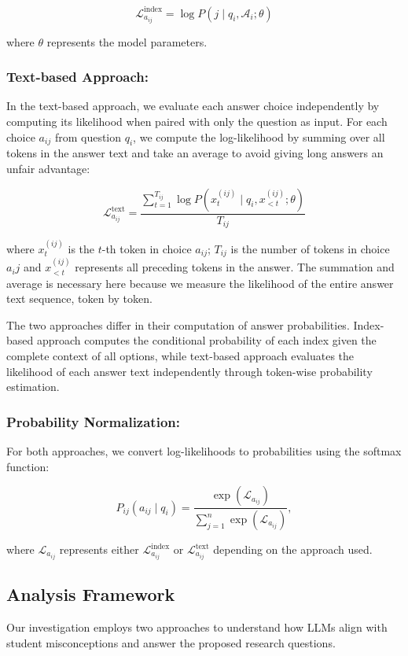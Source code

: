 $$\mathcal{L}_{a_{ij}}^{\text{index}} = \log P(j \mid q_i, \mathcal{A}_i; \theta)$$

where $\theta$ represents the model parameters.

\subsubsection{Text-based Approach:}
In the text-based approach, we evaluate each answer choice independently by computing its likelihood when paired with only the question as input. For each choice $a_{ij}$ from question $q_i$, we compute the log-likelihood by summing over all tokens in the answer text and take an average to avoid giving long answers an unfair advantage:

$$\mathcal{L}_{a_{ij}}^{\text{text}} = \frac{\sum_{t=1}^{T_{ij}} \log P(x_t^{(ij)} \mid q_i, x_{<t}^{(ij)}; \theta)}{T_{ij}}$$

where $x_t^{(ij)}$ is the $t$-th token in choice $a_{ij}$; $T_{ij}$ is the number of tokens in choice $a_ij$ and $x_{<t}^{(ij)}$ represents all preceding tokens in the answer. The summation and average is necessary here because we measure the likelihood of the entire answer text sequence, token by token. 

The two approaches differ in their computation of answer probabilities. Index-based approach computes the conditional probability of each index given the complete context of all options, while text-based approach evaluates the likelihood of each answer text independently through token-wise probability estimation.

\subsubsection{Probability Normalization:}
For both approaches, we convert log-likelihoods to probabilities using the softmax function:

$$P_{ij}(a_{ij} \mid q_i) = \frac{\exp(\mathcal{L}_{a_{ij}})}{\sum_{j=1}^{n} \exp(\mathcal{L}_{a_{ij}})},$$

where $\mathcal{L}_{a_{ij}}$ represents either $\mathcal{L}_{a_{ij}}^{\text{index}}$ or $\mathcal{L}_{a_{ij}}^{\text{text}}$ depending on the approach used.

\subsection{Analysis Framework}

Our investigation employs two approaches to understand how LLMs align with student misconceptions and answer the proposed research questions.

